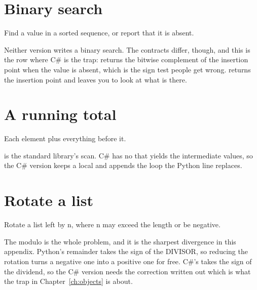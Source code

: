 \section{Binary search}
\label{sec:appD-binary-search}

\noindent
Find a value in a sorted sequence, or report that it is absent.



\noindent
Neither version writes a binary search. The contracts differ, though, and this is the row where C\# is the trap:  returns the bitwise complement of the insertion point when the value is absent, which is the sign test people get wrong.  returns the insertion point and leaves you to look at what is there.

\section{A running total}
\label{sec:appD-running-total}

\noindent
Each element plus everything before it.



\noindent
{} is the standard library's scan. C\# has no  that yields the intermediate values, so the C\# version keeps a local and appends \dash{} the loop the Python line replaces.

\section{Rotate a list}
\label{sec:appD-rotate}

\noindent
Rotate a list left by n, where n may exceed the length or be negative.



\noindent
The modulo is the whole problem, and it is the sharpest divergence in this appendix. Python's remainder takes the sign of the DIVISOR, so reducing the rotation turns a negative one into a positive one for free. C\#'s takes the sign of the dividend, so the C\# version needs the correction written out \dash{} which is what the trap in Chapter~\ref{ch:objects} is about.

